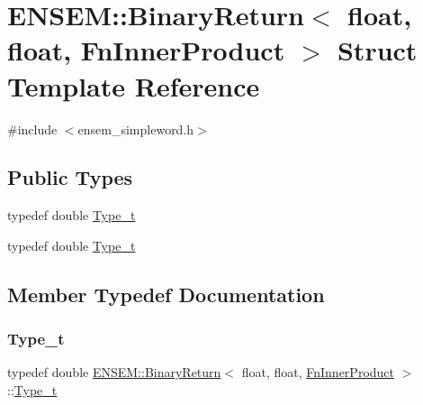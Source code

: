 \hypertarget{structENSEM_1_1BinaryReturn_3_01float_00_01float_00_01FnInnerProduct_01_4}{}\section{E\+N\+S\+EM\+:\+:Binary\+Return$<$ float, float, Fn\+Inner\+Product $>$ Struct Template Reference}
\label{structENSEM_1_1BinaryReturn_3_01float_00_01float_00_01FnInnerProduct_01_4}


{\ttfamily \#include $<$ensem\+\_\+simpleword.\+h$>$}

\subsection*{Public Types}
\begin{DoxyCompactItemize}
\item 
typedef double \mbox{\hyperlink{structENSEM_1_1BinaryReturn_3_01float_00_01float_00_01FnInnerProduct_01_4_a9c257dea59acd1d92cfa3d929aa8ab4b}{Type\+\_\+t}}
\item 
typedef double \mbox{\hyperlink{structENSEM_1_1BinaryReturn_3_01float_00_01float_00_01FnInnerProduct_01_4_a9c257dea59acd1d92cfa3d929aa8ab4b}{Type\+\_\+t}}
\end{DoxyCompactItemize}


\subsection{Member Typedef Documentation}
\mbox{\label{structENSEM_1_1BinaryReturn_3_01float_00_01float_00_01FnInnerProduct_01_4_a9c257dea59acd1d92cfa3d929aa8ab4b}} 
\subsubsection{\texorpdfstring{Type\_t}{Type\_t}\hspace{0.1cm}{\footnotesize\ttfamily [1/2]}}
{\footnotesize\ttfamily typedef double \mbox{\hyperlink{structENSEM_1_1BinaryReturn}{E\+N\+S\+E\+M\+::\+Binary\+Return}}$<$ float, float, \mbox{\hyperlink{structENSEM_1_1FnInnerProduct}{Fn\+Inner\+Product}} $>$\+::\mbox{\hyperlink{structENSEM_1_1BinaryReturn_3_01float_00_01float_00_01FnInnerProduct_01_4_a9c257dea59acd1d92cfa3d929aa8ab4b}{Type\+\_\+t}}}

